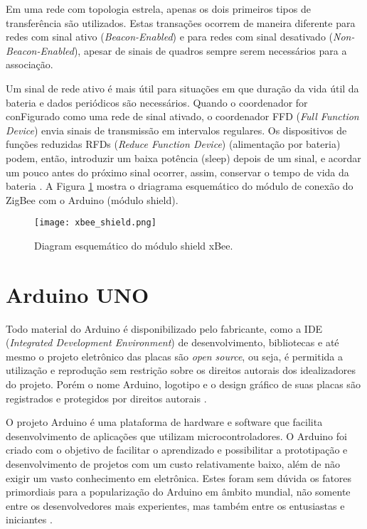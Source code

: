 \documentclass[12pt,report]{uftpibic}
\begin{document}
Em uma rede com topologia estrela, apenas os dois primeiros tipos de transferência são utilizados. Estas transações ocorrem de maneira diferente para redes com sinal ativo ({\it Beacon-Enabled}) e para redes com sinal desativado ({\it Non-Beacon-Enabled}), apesar de sinais de quadros sempre serem necessários para a associação.

Um sinal de rede ativo é mais útil para situações em que duração da vida útil da bateria e dados periódicos são necessários. Quando o coordenador for conFigurado como uma rede de sinal ativado, o coordenador FFD ({\it Full Function Device}) envia sinais de transmissão em intervalos regulares. Os dispositivos de funções reduzidas RFDs ({\it Reduce Function Device}) (alimentação por bateria) podem, então, introduzir um baixa potência (sleep) depois de um sinal, e acordar um pouco antes do próximo sinal ocorrer, assim, conservar o tempo de vida da bateria \cite{marcos}. A Figura \ref{fig:xbee} mostra o driagrama esquemático do módulo de conexão do ZigBee com o Arduino (módulo shield).

\begin{figure}[!h]
\centering
\texttt{[image: xbee\_shield.png]}
\caption{Diagram esquemático do módulo shield xBee.}
\label{fig:xbee}
\end{figure}

\section{Arduino UNO}

Todo material do Arduino é disponibilizado pelo fabricante, como a IDE ({\it Integrated Development Environment}) de desenvolvimento, bibliotecas e até mesmo o projeto eletrônico das placas são {\it open source}, ou seja, é permitida a utilização e reprodução sem restrição sobre os direitos autorais dos idealizadores do projeto. Porém o nome Arduino, logotipo e o design gráfico de suas placas são registrados e protegidos por direitos autorais \cite{marcos}.

O projeto Arduino é uma plataforma de hardware e software que facilita desenvolvimento de aplicações que utilizam microcontroladores. O Arduino foi criado com o objetivo de facilitar o aprendizado e possibilitar a prototipação e desenvolvimento de projetos com um custo relativamente baixo, além de não exigir um vasto conhecimento em eletrônica. Estes foram sem dúvida os fatores primordiais para a popularização do Arduino em âmbito mundial, não somente entre os desenvolvedores mais experientes, mas também entre os entusiastas e iniciantes \cite{marcos}.
\end{document}
